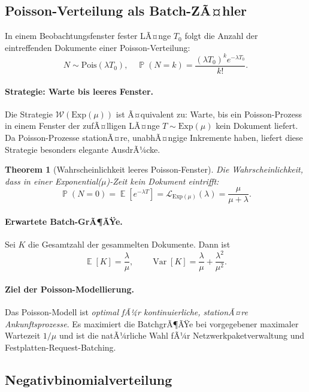 ﻿\documentclass[12pt, a4paper]{article}
\newtheorem{theorem}{Theorem}[section]
\DeclareMathOperator{\E}{\mathbb{E}}
\DeclareMathOperator{\Var}{Var}
\DeclareMathOperator{\Prob}{\mathbb{P}}
\newcommand{\Exp}{\mathrm{Exp}}
\newcommand{\Pois}{\mathrm{Pois}}
\begin{document}
\subsection{Poisson-Verteilung als Batch-ZÃ¤hler}\label{subsec:poisson}

In einem Beobachtungsfenster fester LÃ¤nge $T_0$ folgt die Anzahl der
eintreffenden Dokumente einer Poisson-Verteilung:
\[
  N \sim \Pois(\lambda T_0), \quad
  \Prob(N = k) = \frac{(\lambda T_0)^k e^{-\lambda T_0}}{k!}.
\]

\paragraph{Strategie: Warte bis leeres Fenster.}
Die Strategie $\mathcal{W}(\Exp(\mu))$ ist Ã¤quivalent zu: Warte, bis ein
Poisson-Prozess in einem Fenster der zufÃ¤lligen LÃ¤nge $T \sim \Exp(\mu)$
kein Dokument liefert. Da Poisson-Prozesse stationÃ¤re, unabhÃ¤ngige Inkremente
haben, liefert diese Strategie besonders elegante AusdrÃ¼cke.

\begin{theorem}[Wahrscheinlichkeit leeres Poisson-Fenster]
\label{thm:emptypoisson}
Die Wahrscheinlichkeit, dass in einer Exponential($\mu$)-Zeit kein Dokument
eintrifft:
\[
  \Prob(N = 0) = \E\!\left[e^{-\lambda T}\right] = \mathcal{L}_{\Exp(\mu)}(\lambda) = \frac{\mu}{\mu+\lambda}.
\]
\end{theorem}

\paragraph{Erwartete Batch-GrÃ¶ÃŸe.}
Sei $K$ die Gesamtzahl der gesammelten Dokumente. Dann ist
\[
  \E[K] = \frac{\lambda}{\mu}, \qquad \Var[K] = \frac{\lambda}{\mu} + \frac{\lambda^2}{\mu^2}.
\]

\paragraph{Ziel der Poisson-Modellierung.}
Das Poisson-Modell ist \emph{optimal fÃ¼r kontinuierliche, stationÃ¤re
Ankunftsprozesse}. Es maximiert die BatchgrÃ¶ÃŸe bei vorgegebener maximaler
Wartezeit $1/\mu$ und ist die natÃ¼rliche Wahl fÃ¼r Netzwerkpaketverwaltung
und Festplatten-Request-Batching.

\subsection{Negativbinomialverteilung}\label{subsec:negbin}
\end{document}
